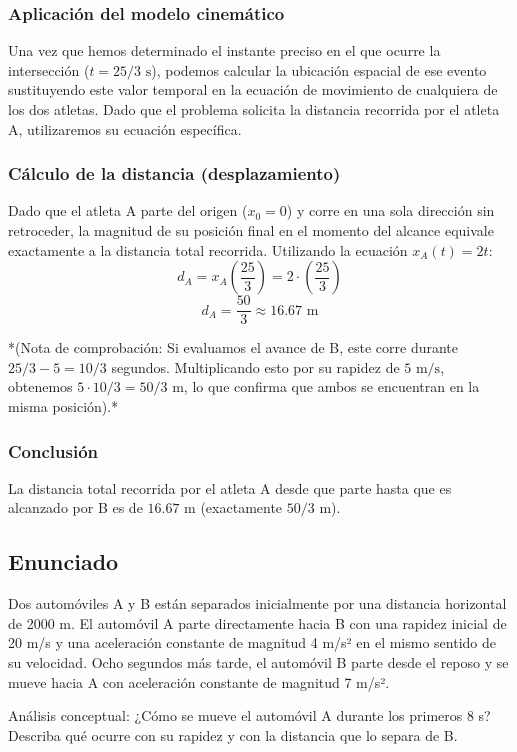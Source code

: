 \documentclass[12pt, a4paper]{article}
\begin{document}
\subsubsection*{Aplicación del modelo cinemático}
Una vez que hemos determinado el instante preciso en el que ocurre la intersección ($t = 25/3\text{ s}$), podemos calcular la ubicación espacial de ese evento sustituyendo este valor temporal en la ecuación de movimiento de cualquiera de los dos atletas. Dado que el problema solicita la distancia recorrida por el atleta A, utilizaremos su ecuación específica.

\subsubsection*{Cálculo de la distancia (desplazamiento)}
Dado que el atleta A parte del origen ($x_0 = 0$) y corre en una sola dirección sin retroceder, la magnitud de su posición final en el momento del alcance equivale exactamente a la distancia total recorrida.
Utilizando la ecuación $x_A(t) = 2t$:
$$d_A = x_A\left(\frac{25}{3}\right) = 2 \cdot \left(\frac{25}{3}\right)$$
$$d_A = \frac{50}{3} \approx 16.67\text{ m}$$

*(Nota de comprobación: Si evaluamos el avance de B, este corre durante $25/3 - 5 = 10/3$ segundos. Multiplicando esto por su rapidez de $5\text{ m/s}$, obtenemos $5 \cdot 10/3 = 50/3\text{ m}$, lo que confirma que ambos se encuentran en la misma posición).*

\subsubsection*{Conclusión}
La distancia total recorrida por el atleta A desde que parte hasta que es alcanzado por B es de $16.67\text{ m}$ (exactamente $50/3\text{ m}$).

\newpage
\subsection*{Enunciado}
 Dos automóviles A y B están separados inicialmente por una distancia horizontal de 2000 m. El automóvil A parte directamente hacia B con una rapidez inicial de 20 m/s y una aceleración constante de magnitud 4 m/s² en el mismo sentido de su velocidad. Ocho segundos más tarde, el automóvil B parte desde el reposo y se mueve hacia A con aceleración constante de magnitud 7 m/s².

Análisis conceptual: ¿Cómo se mueve el automóvil A durante los primeros 8 s? Describa qué ocurre con su rapidez y con la distancia que lo separa de B.
\end{document}
